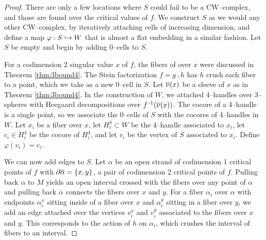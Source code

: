 \begin{proof}
	There are only a few locations where $S$ could fail to be a CW--complex, and those are found over the critical values of $f$.
	We construct $S$ as we would any other CW--complex, by iteratively attaching cells of increasing dimension, and define a map $\varphi:S\hookrightarrow W$ that is almost a flat embedding in a similar fashion.
	Let $S$ be empty and begin by adding 0--cells to $S$.
	
	For a codimension 2 singular value $x$ of $f$, the fibers of over $x$ were discussed in Theorem \ref{thm:3bound4}.
	The Stein factorization $f=g\comp h$ has $h$ crush each fiber to a point, which we take as a new 0--cell in $S$.
	Let $\overline{\nu}(x)$ be a sleeve of $x$ as in Theorem \ref{thm:3bound4}.
	In the construction of $W$, we attached 4--handles over 3--spheres with Heegaard decompositions over $f^{\,\text{-}1}(\overline{\nu}(x))$.
	The cocore of a 4--handle is a single point, so we associate the 0--cells of $S$ with the cocores of 4--handles in $W$.
	Let $x_i$ be a fiber over $x$, let $H_i^4\subset W$ be the 4--handle associated to $x_i$, let $c_i\in H_i^4$ be the cocore of $H_i^4$, and let $v_i$ be the vertex of $S$ associated to $x_i$.
	Define $\varphi(v_i)=c_i$.
	
	We can now add edges to $S$.
	Let $\alpha$ be an open strand of codimension 1 critical points of $f$ with $\partial\overline\alpha=\{x,y\}$, a pair of codimension 2 critical points of $f$.
	Pulling back $\alpha$ to $M$ yields an open interval crossed with the fibers over any point of $\alpha$ and pulling back $\overline\alpha$ connects the fibers over $x$ and $y$.
	For a fiber $\alpha_i$ over $\alpha$ with endpoints $\alpha_i^x$ sitting inside of a fiber over $x$ and $\alpha_i^y$ sitting in a fiber over $y$, we add an edge attached over the vertices $v_i^x$ and $v_i^y$ associated to the fibers over $x$ and $y$.
	This corresponds to the action of $h$ on $\alpha_i$, which crushes the interval of fibers to an interval.
	

\end{proof}
